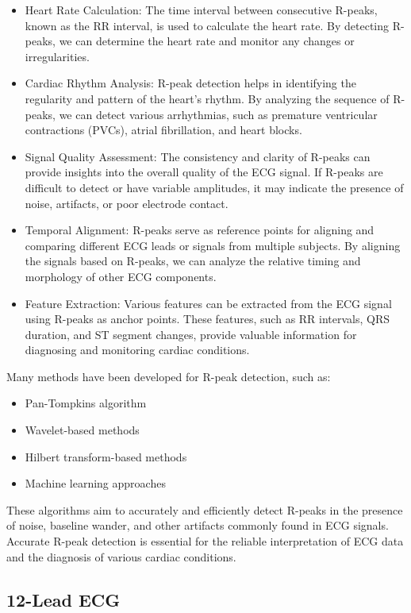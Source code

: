 \documentclass{mldsmsc}
\begin{document}
\begin{itemize}
    \item Heart Rate Calculation: The time interval between consecutive R-peaks, known as the RR interval, is used to calculate the heart rate. By detecting R-peaks, we can determine the heart rate and monitor any changes or irregularities.
    \item Cardiac Rhythm Analysis: R-peak detection helps in identifying the regularity and pattern of the heart's rhythm. By analyzing the sequence of R-peaks, we can detect various arrhythmias, such as premature ventricular contractions (PVCs), atrial fibrillation, and heart blocks.
    \item Signal Quality Assessment: The consistency and clarity of R-peaks can provide insights into the overall quality of the ECG signal. If R-peaks are difficult to detect or have variable amplitudes, it may indicate the presence of noise, artifacts, or poor electrode contact.
    \item Temporal Alignment: R-peaks serve as reference points for aligning and comparing different ECG leads or signals from multiple subjects. By aligning the signals based on R-peaks, we can analyze the relative timing and morphology of other ECG components.
    \item Feature Extraction: Various features can be extracted from the ECG signal using R-peaks as anchor points. These features, such as RR intervals, QRS duration, and ST segment changes, provide valuable information for diagnosing and monitoring cardiac conditions.
\end{itemize}  
Many methods have been developed for R-peak detection, such as:
\begin{itemize}
    \item Pan-Tompkins algorithm
    \item Wavelet-based methods
    \item Hilbert transform-based methods
    \item Machine learning approaches
\end{itemize}
These algorithms aim to accurately and efficiently detect R-peaks in the presence of noise, baseline wander, and other artifacts commonly found in ECG signals. Accurate R-peak detection is essential for the reliable interpretation of ECG data and the diagnosis of various cardiac conditions.

\subsection{12-Lead ECG}\label{sec:12leads}
\end{document}
